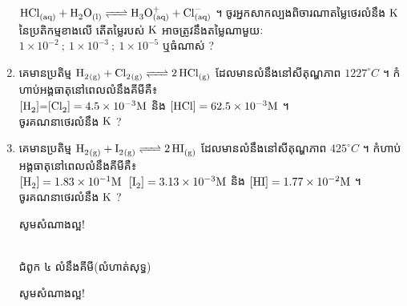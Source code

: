 \documentclass[13pt, a4paper]{article}
\begin{document}
\begin{enumerate}[m]
	$\ce{HCl_{(aq)} + H2O_{(l)} <=> H3O^+_{(aq)} + Cl^-_{(aq)}} $ ។
	ចូរអ្នកសាកល្បងពិចារណាតម្លៃថេរលំនឹង $\ce{K}$ នៃប្រតិកម្មខាងលើ តើតម្លៃរបស់ $\ce{K}$ អាចត្រូវនឹងតម្លៃណាមួយៈ  $1\times10^{-2}~;~1\times10^{-3}~;~1\times10^{-5}$ ឬធំណាស់ ?
	\item គេមានប្រតិម្ម $\ce{H2_{(g)} + Cl2_{(g)} <=> 2HCl_{(g)}}$ ដែលមានលំនឹងនៅសីតុណ្ហភាព $1227^\circ C$ ។ កំហាប់អង្គធាតុនៅពេលលំនឹងគីមីគឺ៖\\ $\ce{[H2]=[Cl2]}=4.5\times10^{-3}\ce{M}$ និង $\ce{[HCl]}=62.5\times10^{-3}\ce{M}$ ។\\
	ចូរគណនាថេរលំនឹង $\ce{K}$ ? 
	\item គេមានប្រតិម្ម $\ce{H2_{(g)} + I2_{(g)} <=> 2HI_{(g)}}$ ដែលមានលំនឹងនៅសីតុណ្ហភាព $425^\circ C$ ។ កំហាប់អង្គធាតុនៅពេលលំនឹងគីមីគឺ៖\\ $\ce{[H2]}=1.83\times10^{-1}\ce{M} ~~\ce{[I2]}=3.13\times10^{-3}\ce{M}$ និង $\ce{[HI]}=1.77\times10^{-2}\ce{M}$ ។\\
	ចូរគណនាថេរលំនឹង $\ce{K}$ ? 
	\begin{center}
		\sffamily\color{black}
		សូមសំណាងល្អ!
	\end{center}\newpage
	\begin{center}
		\sffamily\color{black}
		\\
		ជំពូក ៤ លំនឹងគីមី(លំហាត់សុទ្ធ)
	\end{center} 
	\begin{center}
		\sffamily\color{black}
		សូមសំណាងល្អ!
	\end{center}\newpage
\end{enumerate}
\end{document}
